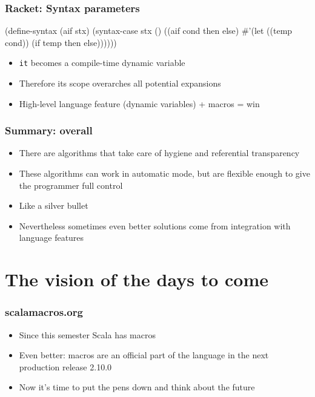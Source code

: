 \documentclass[hyperref={bookmarks=false}]{beamer}
\begin{document}
\begin{frame}[fragile]
\frametitle{Racket: Syntax parameters}
\begin{semiverbatim}

\text{\color{teal}{(define-syntax-parameter it (syntax-rules ()))}}

(define-syntax (aif stx)
  (syntax-case stx ()
    ((aif cond then else)
     #'(let ((temp cond))
             \text{\color{teal}{(syntax-parameterize}}
               \text{\color{teal}{((it (syntax-rules () ((_) temp))))}}
         (if temp then else))))))

\end{semiverbatim}

\begin{itemize}
\item \texttt{it} becomes a compile-time dynamic variable
\item Therefore its scope overarches all potential expansions
\item High-level language feature (dynamic variables) + macros = win
\end{itemize}
\end{frame}

\begin{frame}[fragile]
\frametitle{Summary: overall}
\begin{itemize}
\item There are algorithms that take care of hygiene and referential transparency
\item These algorithms can work in automatic mode, but are flexible enough to give the programmer full control
\item Like a silver bullet
\item Nevertheless sometimes even better solutions come from integration with language features
\end{itemize}
\end{frame}

\section{The vision of the days to come}

\begin{frame}[fragile]
\frametitle{scalamacros.org}
\begin{itemize}
\item Since this semester Scala has macros
\item Even better: macros are an official part of the language in the next production release 2.10.0
\item Now it's time to put the pens down and think about the future
\end{itemize}
\end{frame}
\end{document}
